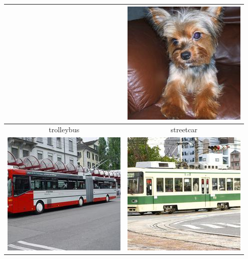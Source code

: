 \documentclass{article}
\begin{document}
\begin{table}[]
\begin{tabular}{|c c|}
\begin{minipage}{.4\linewidth}
    \end{minipage}     & 
    \begin{minipage}{.4\linewidth}
    \centering
      \includegraphics[width=.6\linewidth]{pairs/Yorkshire_terrier.JPEG}
    \end{minipage}\\
        \hline
    trolleybus   &  streetcar\\
    \begin{minipage}{.4\linewidth}
    \centering
      \includegraphics[width=.6\linewidth]{pairs/trolleybus.JPEG}
    \end{minipage}     & 
    \begin{minipage}{.4\linewidth}
    \centering
      \includegraphics[width=.6\linewidth]{pairs/streetcar.JPEG}

\end{minipage}
\end{tabular}
\end{table}
\end{document}
